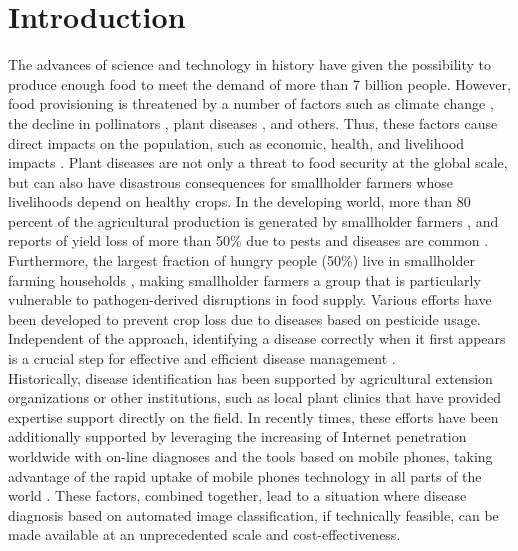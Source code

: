 \section{Introduction}
The advances of science and technology in history have given the possibility to produce enough food to meet the demand of more than 7 billion people. However, food provisioning is threatened by a number of factors such as climate change \cite{ref1}, the decline in pollinators \cite{ref2}, plant diseases \cite{ref3}, and others. Thus, these factors cause direct impacts on the population, such as economic, health, and livelihood impacts \cite{ref4}. Plant diseases are not only a threat to food security at the global scale, but can also have disastrous consequences for smallholder farmers whose livelihoods depend on healthy crops. In the developing world, more than 80 percent of the agricultural production is generated by smallholder farmers \cite{ref5}, and reports of yield loss of more than 50\% due to pests and diseases are common \cite{ref6}. Furthermore, the largest fraction of hungry people (50\%) live in smallholder farming households \cite{ref7}, making smallholder farmers a group that is particularly vulnerable to pathogen-derived disruptions in food supply.
Various efforts have been developed to prevent crop loss due to diseases based on pesticide usage. Independent of the approach, identifying a disease correctly when it first appears is a crucial step for effective and efficient disease management \cite{ref8}.
\\\indent
Historically, disease identification has been supported by agricultural extension organizations or other institutions, such as local plant clinics that have provided expertise support directly on the field. In recently times, these efforts have been additionally supported by leveraging the increasing of Internet penetration worldwide with on-line diagnoses and the tools based on mobile phones, taking advantage of the rapid uptake of mobile phones technology in all parts of the world \cite{ref9}. These factors, combined together, lead to a situation where disease diagnosis based on automated image classification, if technically feasible, can be made available at an unprecedented scale and cost-effectiveness.
\\\indent
